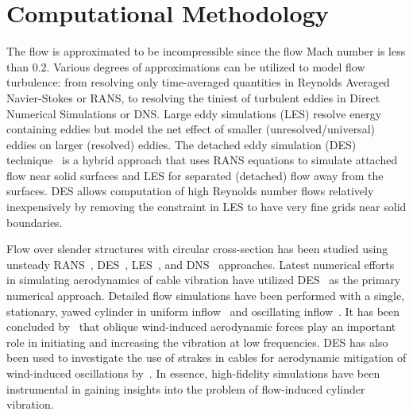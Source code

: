 \section{Computational Methodology}
\label{sec:methodology}
%
The flow is approximated to be incompressible since the flow Mach number is
less than $0.2$. Various degrees of approximations can be utilized to model
flow turbulence: from resolving only time-averaged quantities in Reynolds
Averaged Navier-Stokes or RANS, to resolving the tiniest of turbulent eddies in
Direct Numerical Simulations or DNS. Large eddy simulations (LES) resolve
energy containing eddies but model the net effect of smaller
(unresolved/universal) eddies on larger (resolved) eddies. The detached eddy
simulation (DES) technique~\citep{spalart1997comments} is a hybrid approach
that uses RANS equations to simulate attached flow near solid surfaces and LES
for separated (detached) flow away from the surfaces. DES allows computation of
high Reynolds number flows relatively inexpensively by removing the constraint
in LES to have very fine grids near solid boundaries.

Flow over slender structures with circular cross-section has been studied using
unsteady RANS~\citep{pontaza2009three},
DES~\citep{travin2000detached,yeo2012aerodynamic},
LES~\citep{breuer1998large,kravchenko2000numerical,catalano2003numerical}, and
DNS~\citep{dong2005dns,zhao2009direct} approaches. Latest numerical efforts in
simulating aerodynamics of cable vibration have utilized
DES~\citep{yeo2007characteristics,yeo2008investigation,yeo2012aerodynamic,yeo2011computational}
as the primary numerical approach. Detailed flow simulations have been
performed with a single, stationary, yawed cylinder in uniform
inflow~\citep{yeo2007characteristics,yeo2008investigation} and oscillating
inflow~\citep{yeo2012aerodynamic}. It has been concluded
by~\cite{yeo2012aerodynamic} that oblique wind-induced aerodynamic forces play
an important role in initiating and increasing the vibration at low
frequencies. DES has also been used to investigate the use of strakes in cables
for aerodynamic mitigation of wind-induced oscillations
by~\cite{yeo2011computational}. In essence, high-fidelity simulations have been
instrumental in gaining insights into the problem of flow-induced cylinder
vibration.

